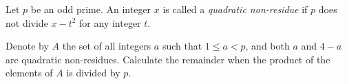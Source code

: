 Let $p$ be an odd prime. An integer $x$ is called a \textit{quadratic non-residue} if $p$ does not divide $x-t^2$ for any integer $t$.

Denote by $A$ the set of all integers $a$ such that $1\le a<p$, and both $a$ and $4-a$ are quadratic non-residues. Calculate the remainder when the product of the elements of $A$ is divided by $p$.

